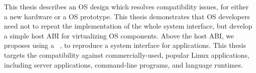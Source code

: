 This thesis describes an OS design which resolves compatibility issues, for either a new hardware or a OS prototype.
This thesis demonstrates that OS developers need not to repeat the implementation of
the whole system interface,
but develop a simple host ABI for virtualizing OS components.
Above the host ABI, we proposes using a {\bf \libos{}}~\cite{porter11drawbridge,engler95exokernel,libra,unikernels},
to reproduce a system interface for applications.
This thesis targets the compatibility against commercially-used, popular Linux applications, including server applications, command-line programs, and language runtimes.




